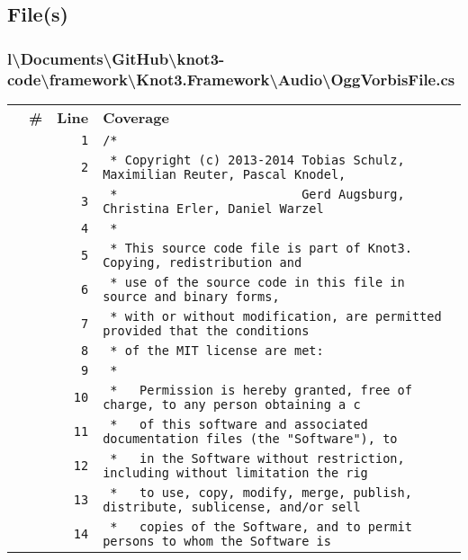 \documentclass[a4paper,10pt]{article}
\begin{document}
\subsection{File(s)}
\subsubsection{l\textbackslash Documents\textbackslash GitHub\textbackslash knot3-code\textbackslash framework\textbackslash Knot3.Framework\textbackslash Audio\textbackslash OggVorbisFile.cs}
\begin{longtable}[l]{lrrl}
\textbf{} & \textbf{\#} & \textbf{Line} & \textbf{Coverage}\\
\cellcolor{gray} &  & \verb~1~ & \verb~/*~\\
\cellcolor{gray} &  & \verb~2~ & \verb~ * Copyright (c) 2013-2014 Tobias Schulz, Maximilian Reuter, Pascal Knodel,~\\
\cellcolor{gray} &  & \verb~3~ & \verb~ *                         Gerd Augsburg, Christina Erler, Daniel Warzel~\\
\cellcolor{gray} &  & \verb~4~ & \verb~ *~\\
\cellcolor{gray} &  & \verb~5~ & \verb~ * This source code file is part of Knot3. Copying, redistribution and~\\
\cellcolor{gray} &  & \verb~6~ & \verb~ * use of the source code in this file in source and binary forms,~\\
\cellcolor{gray} &  & \verb~7~ & \verb~ * with or without modification, are permitted provided that the conditions~\\
\cellcolor{gray} &  & \verb~8~ & \verb~ * of the MIT license are met:~\\
\cellcolor{gray} &  & \verb~9~ & \verb~ *~\\
\cellcolor{gray} &  & \verb~10~ & \verb~ *   Permission is hereby granted, free of charge, to any person obtaining a c~\\
\cellcolor{gray} &  & \verb~11~ & \verb~ *   of this software and associated documentation files (the "Software"), to ~\\
\cellcolor{gray} &  & \verb~12~ & \verb~ *   in the Software without restriction, including without limitation the rig~\\
\cellcolor{gray} &  & \verb~13~ & \verb~ *   to use, copy, modify, merge, publish, distribute, sublicense, and/or sell~\\
\cellcolor{gray} &  & \verb~14~ & \verb~ *   copies of the Software, and to permit persons to whom the Software is~\\

\end{longtable}
\end{document}
